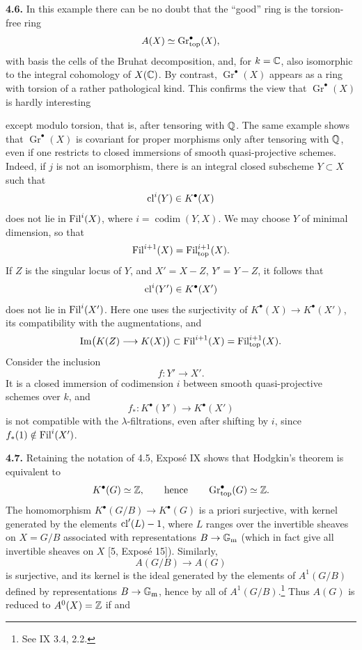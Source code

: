\textbf{4.6.} In this example there can be no doubt that the ``good'' ring
is the torsion-free ring
\[
 A(X)\simeq\operatorname{Gr}_{\mathrm{top}}^\bullet(X),
\]
with basis the cells of the Bruhat decomposition, and, for $k=\mathbb C$, also
isomorphic to the integral cohomology of $X(\mathbb C)$. By contrast,
$\operatorname{Gr}^\bullet(X)$ appears as a ring with torsion of a rather
pathological kind. This confirms the view that
$\operatorname{Gr}^\bullet(X)$ is hardly interesting

except modulo torsion, that is, after tensoring with $\mathbb Q$. The same example
shows that $\operatorname{Gr}^\bullet(X)$ is covariant for proper morphisms
only after tensoring with $\mathbb Q$, even if one restricts to closed immersions
of smooth quasi-projective schemes. Indeed, if $j$ is not an isomorphism,
there is an integral closed subscheme $Y\subset X$ such that
\[
 \operatorname{cl}^i(Y)\in K^\bullet(X)
\]
does not lie in $\operatorname{Fil}^i(X)$, where $i=\operatorname{codim}(Y,X)$. We may
choose $Y$ of minimal dimension, so that
\[
 \operatorname{Fil}^{i+1}(X)=\operatorname{Fil}_{\mathrm{top}}^{i+1}(X).
\]
If $Z$ is the singular locus of $Y$, and $X'=X-Z$, $Y'=Y-Z$, it follows
that
\[
 \operatorname{cl}^i(Y')\in K^\bullet(X')
\]
does not lie in $\operatorname{Fil}^i(X')$. Here one uses the surjectivity of
$K^\bullet(X)\to K^\bullet(X')$, its compatibility with the augmentations,
and
\[
 \operatorname{Im}\bigl(K(Z)\longrightarrow K(X)\bigr)
 \subset\operatorname{Fil}^{i+1}(X)=\operatorname{Fil}_{\mathrm{top}}^{i+1}(X).
\]
Consider the inclusion
\[
 f:Y'\longrightarrow X'.
\]
It is a closed immersion of codimension $i$ between smooth
quasi-projective schemes over $k$, and
\[
 f_*:K^\bullet(Y')\longrightarrow K^\bullet(X')
\]
is not compatible with the $\lambda$-filtrations, even after shifting by
$i$, since $f_*(1)\notin\operatorname{Fil}^i(X')$.

\textbf{4.7.} Retaining the notation of 4.5, Exposé IX shows that Hodgkin's
theorem is equivalent to
\[
 K^\bullet(G)\simeq\mathbb Z,
 \qquad\text{hence}\qquad
 \operatorname{Gr}_{\mathrm{top}}^\bullet(G)\simeq\mathbb Z.
\]
The homomorphism $K^\bullet(G/B)\to K^\bullet(G)$ is a priori surjective,
with kernel generated by the elements $\operatorname{cl}'(L)-1$, where $L$ ranges over
the invertible sheaves on $X=G/B$ associated with representations
$B\to\mathbb G_{\mathrm m}$ (which in fact give all invertible sheaves on $X$ [5,
Exposé 15]). Similarly,
\[
 A(G/B)\longrightarrow A(G)
\]
is surjective, and its kernel is the ideal generated by the elements of
$A^1(G/B)$ defined by representations $B\to\mathbb G_{\mathrm m}$, hence by all of
$A^1(G/B)$.\footnote{See IX 3.4, 2.2.} Thus $A(G)$ is reduced to
$A^0(X)=\mathbb Z$ if and

